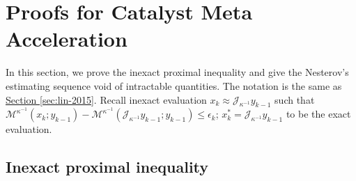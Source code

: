 \documentclass[12pt]{article}
\begin{document}
        
\section{Proofs for Catalyst Meta Acceleration}
    In this section, we prove the inexact proximal inequality and give the Nesterov's estimating sequence void of intractable quantities. 
    The notation is the same as
    \hyperref[sec:lin-2015]{Section \ref*{sec:lin-2015}}. 
    Recall inexact evaluation $x_k \approx \mathcal J_{\kappa^{-1}}y_{k - 1}$ such that $\mathcal M^{\kappa^{-1}}(x_k; y_{k - 1}) - \mathcal M^{\kappa^{-1}}(\mathcal J_{\kappa^{-1}}y_{k - 1}; y_{k - 1}) \le \epsilon_k$; $x_k^* = \mathcal J_{\kappa^{-1}}y_{k - 1}$ to be the exact evaluation. 
    
    \subsection{Inexact proximal inequality}\label{app:sec:inxct-pg-ineq}
\end{document}
